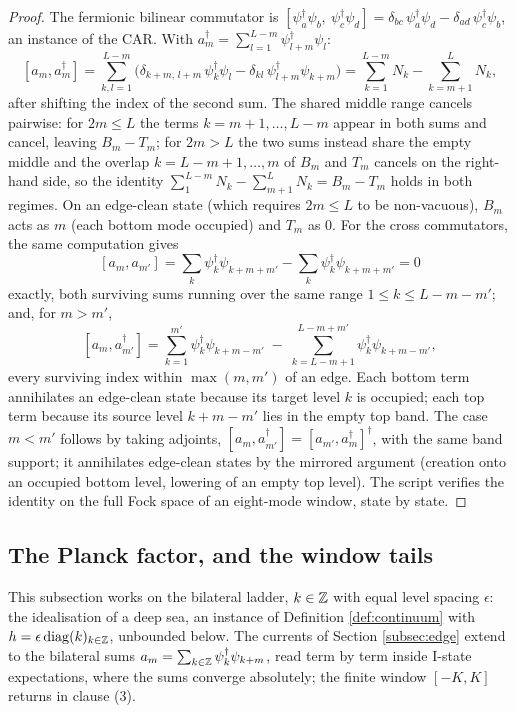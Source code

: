\begin{proof}
The fermionic bilinear commutator is $[\psi_a^\dagger\psi_b,\ \psi_c^\dagger\psi_d] = \delta_{bc}\,\psi_a^\dagger\psi_d - \delta_{ad}\,\psi_c^\dagger\psi_b$, an instance of the CAR. With $a_m^\dagger = \sum_{l=1}^{L-m}\psi_{l+m}^\dagger\psi_l$:
\[
[a_m, a_m^\dagger] = \sum_{k,l=1}^{L-m}\bigl(\delta_{k+m,\,l+m}\,\psi_k^\dagger\psi_l - \delta_{k l}\,\psi_{l+m}^\dagger\psi_{k+m}\bigr)
= \sum_{k=1}^{L-m} N_k - \sum_{k=m+1}^{L} N_k ,
\]
after shifting the index of the second sum. The shared middle range cancels pairwise: for $2m \le L$ the terms $k = m{+}1, \dots, L{-}m$ appear in both sums and cancel, leaving $B_m - T_m$; for $2m > L$ the two sums instead share the empty middle and the overlap $k = L{-}m{+}1, \dots, m$ of $B_m$ and $T_m$ cancels on the right-hand side, so the identity $\sum_{1}^{L-m} N_k - \sum_{m+1}^{L} N_k = B_m - T_m$ holds in both regimes. On an edge-clean state (which requires $2m \le L$ to be non-vacuous), $B_m$ acts as $m$ (each bottom mode occupied) and $T_m$ as $0$. For the cross commutators, the same computation gives
\[
[a_m, a_{m'}] = \sum_{k}\psi_k^\dagger\psi_{k+m+m'} - \sum_{k}\psi_k^\dagger\psi_{k+m+m'} = 0
\]
exactly, both surviving sums running over the same range $1 \le k \le L - m - m'$; and, for $m > m'$,
\[
[a_m, a_{m'}^\dagger] = \sum_{k=1}^{m'}\psi_k^\dagger\psi_{k+m-m'} \;-\; \sum_{k=L-m+1}^{L-m+m'}\psi_k^\dagger\psi_{k+m-m'},
\]
every surviving index within $\max(m,m')$ of an edge. Each bottom term annihilates an edge-clean state because its target level $k$ is occupied; each top term because its source level $k + m - m'$ lies in the empty top band. The case $m < m'$ follows by taking adjoints, $[a_m, a_{m'}^\dagger] = [a_{m'}, a_m^\dagger]^\dagger$, with the same band support; it annihilates edge-clean states by the mirrored argument (creation onto an occupied bottom level, lowering of an empty top level). The script verifies the identity on the full Fock space of an eight-mode window, state by state.
\end{proof}

\subsection{The Planck factor, and the window tails}\label{subsec:planck}

This subsection works on the bilateral ladder, $k \in \mathbb{Z}$ with equal level spacing $\epsilon$: the idealisation of a deep sea, an instance of Definition \ref{def:continuum} with $h = \epsilon\,\mathrm{diag}(k)_{k \in \mathbb{Z}}$, unbounded below. The currents of Section \ref{subsec:edge} extend to the bilateral sums $a_m = \sum_{k \in \mathbb{Z}}\psi_k^\dagger\psi_{k+m}$, read term by term inside I-state expectations, where the sums converge absolutely; the finite window $[-K, K]$ returns in clause (3).

